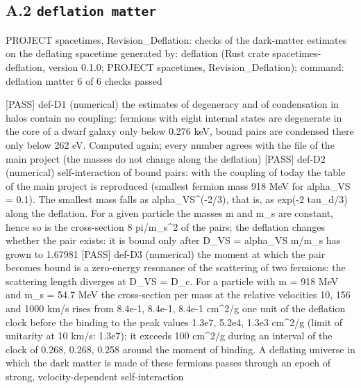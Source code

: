 \documentclass[
  10pt,
]{article}
\newenvironment{Shaded}{}{}
\newcommand{\NormalTok}[1]{#1}
\begin{document}
\hypertarget{a.2-deflation-matter}{%
\subsection{\texorpdfstring{A.2
\texttt{deflation\ matter}}{A.2 deflation matter}}\label{a.2-deflation-matter}}

\begin{Shaded}
\begin{Highlighting}[]
\NormalTok{PROJECT spacetimes, Revision\_Deflation: checks of the dark{-}matter estimates on the deflating spacetime}
\NormalTok{generated by: deflation (Rust crate spacetimes{-}deflation, version 0.1.0; PROJECT spacetimes, Revision\_Deflation); command: deflation matter}
\NormalTok{6 of 6 checks passed}

\NormalTok{[PASS] def{-}D1  (numerical) the estimates of degeneracy and of condensation in halos contain no coupling: fermions with eight internal states are degenerate in the core of a dwarf galaxy only below 0.276 keV, bound pairs are condensed there only below 262 eV. Computed again; every number agrees with the file of the main project (the masses do not change along the deflation)}
\NormalTok{[PASS] def{-}D2  (numerical) self{-}interaction of bound pairs: with the coupling of today the table of the main project is reproduced (smallest fermion mass 918 MeV for alpha\_VS = 0.1). The smallest mass falls as alpha\_VS\^{}({-}2/3), that is, as exp({-}2 tau\_d/3) along the deflation. For a given particle the masses m and m\_s are constant, hence so is the cross{-}section 8 pi/m\_s\^{}2 of the pairs; the deflation changes whether the pair exists: it is bound only after D\_VS = alpha\_VS m/m\_s has grown to 1.67981}
\NormalTok{[PASS] def{-}D3  (numerical) the moment at which the pair becomes bound is a zero{-}energy resonance of the scattering of two fermions: the scattering length diverges at D\_VS = D\_c. For a particle with m = 918 MeV and m\_s = 54.7 MeV the cross{-}section per mass at the relative velocities 10, 156 and 1000 km/s rises from 8.4e{-}1, 8.4e{-}1, 8.4e{-}1 cm\^{}2/g one unit of the deflation clock before the binding to the peak values 1.3e7, 5.2e4, 1.3e3 cm\^{}2/g (limit of unitarity at 10 km/s: 1.3e7); it exceeds 100 cm\^{}2/g during an interval of the clock of 0.268, 0.268, 0.258 around the moment of binding. A deflating universe in which the dark matter is made of these fermions passes through an epoch of strong, velocity{-}dependent self{-}interaction}

\end{Highlighting}
\end{Shaded}
\end{document}
